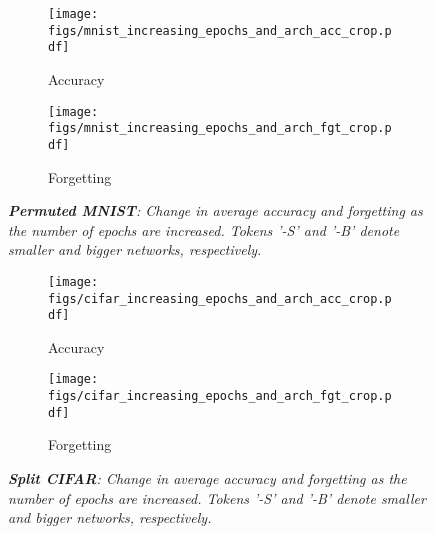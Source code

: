 \begin{figure}[H]
	\begin{subfigure}{0.45\linewidth}
	\begin{center}
		\texttt{[image: figs/mnist\_increasing\_epochs\_and\_arch\_acc\_crop.pdf]}
		\caption{\small Accuracy}
	\end{center}
	\end{subfigure}\begin{subfigure}{0.55\linewidth}
	\begin{center}
		\texttt{[image: figs/mnist\_increasing\_epochs\_and\_arch\_fgt\_crop.pdf]}
		\caption{\small Forgetting}
	\end{center}
	\end{subfigure}\vspace{-3mm}
\caption{\em \textbf{Permuted MNIST}: Change in average accuracy and forgetting as the number of epochs are increased. Tokens '-S' and '-B' denote smaller and bigger networks, respectively.}
	\label{fig:supp_mnist_inc_epoch}
\end{figure}

\begin{figure}[H]
	\begin{subfigure}{0.45\linewidth}
	\begin{center}
		\texttt{[image: figs/cifar\_increasing\_epochs\_and\_arch\_acc\_crop.pdf]}
		\caption{\small Accuracy}
	\end{center}
	\end{subfigure}\begin{subfigure}{0.55\linewidth}
	\begin{center}
		\texttt{[image: figs/cifar\_increasing\_epochs\_and\_arch\_fgt\_crop.pdf]}
		\caption{\small Forgetting}
	\end{center}
	\end{subfigure}\vspace{-3mm}
\caption{\em  \textbf{Split CIFAR}: Change in average accuracy and forgetting as the number of epochs are increased. Tokens '-S' and '-B' denote smaller and bigger networks, respectively.}
	\label{fig:supp_cifar_inc_epoch}
\end{figure}




